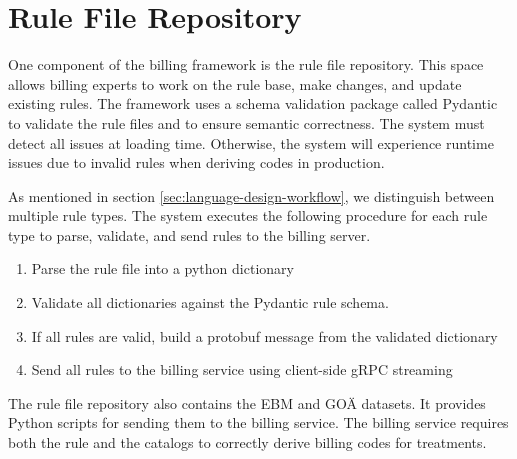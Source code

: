 \section{Rule File Repository}\label{sec:rule-file-repository}
One component of the billing framework is the rule file repository.
This space allows billing experts to work on the rule base, make changes, and update existing rules.
The framework uses a schema validation package called Pydantic to validate the rule files and to ensure semantic correctness.
The system must detect all issues at loading time.
Otherwise, the system will experience runtime issues due to invalid rules when deriving codes in production.

As mentioned in section \ref{sec:language-design-workflow}, we distinguish between multiple rule types.
The system executes the following procedure for each rule type to parse, validate, and send \RL rules to the billing server.

\begin{enumerate}
    \item Parse the rule file into a python dictionary
    \item Validate all dictionaries against the Pydantic rule schema.
    \item If all rules are valid, build a  protobuf message from the validated dictionary
    \item Send all rules to the billing service using client-side gRPC streaming
\end{enumerate}

The rule file repository also contains the EBM and GOÄ datasets.
It provides Python scripts for sending them to the billing service.
The billing service requires both the rule and the catalogs to correctly derive billing codes for treatments.
